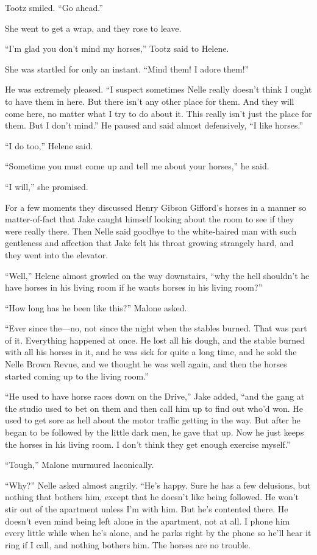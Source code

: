 \documentclass{novel}
\begin{document}
Tootz smiled. “Go ahead.”

She went to get a wrap, and they rose to leave.

“I’m glad you don’t mind my horses,” Tootz said to Helene.

She was startled for only an instant. “Mind them! I adore them!”

He was extremely pleased. “I suspect sometimes Nelle really doesn’t think I ought to have them in here. But there isn’t any other place for them. And they will come here, no matter what I try to do about it. This really isn’t just the place for them. But I don’t mind.” He paused and said almost defensively, “I like horses.”

“I do too,” Helene said.

“Sometime you must come up and tell me about your horses,” he said.

“I will,” she promised.

For a few moments they discussed Henry Gibson Gifford’s horses in a manner so matter-of-fact that Jake caught himself looking about the room to see if they were really there. Then Nelle said goodbye to the white-haired man with such gentleness and affection that Jake felt his throat growing strangely hard, and they went into the elevator.

“Well,” Helene almost growled on the way downstairs, “why the hell shouldn’t he have horses in his living room if he wants horses in his living room?”

“How long has he been like this?” Malone asked.

“Ever since the—no, not since the night when the stables burned. That was part of it. Everything happened at once. He lost all his dough, and the stable burned with all his horses in it, and he was sick for quite a long time, and he sold the Nelle Brown Revue, and we thought he was well again, and then the horses started coming up to the living room.”

“He used to have horse races down on the Drive,” Jake added, “and the gang at the studio used to bet on them and then call him up to find out who’d won. He used to get sore as hell about the motor traffic getting in the way. But after he began to be followed by the little dark men, he gave that up. Now he just keeps the horses in his living room. I don’t think they get enough exercise myself.”

“Tough,” Malone murmured laconically.

“Why?” Nelle asked almost angrily. “He’s happy. Sure he has a few delusions, but nothing that bothers him, except that he doesn’t like being followed. He won’t stir out of the apartment unless I’m with him. But he’s contented there. He doesn’t even mind being left alone in the apartment, not at all. I phone him every little while when he’s alone, and he parks right by the phone so he’ll hear it ring if I call, and nothing bothers him. The horses are no trouble.
\end{document}
